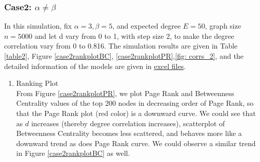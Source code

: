 \documentclass{article}
\begin{document}
\subsubsection{Case2: $\alpha \neq \beta$}
\quad
\par In this simulation, fix $\alpha=3, \beta=5$, and expected degree $E = 50$, graph size $ n=5000$ and let d vary from 0 to 1, with step size 2,  to make the degree correlation vary from 0 to 0.816. The simulation results are given in Table \ref{table2}, Figure \ref{case2rankplotBC}, \ref{case2rankplotPR},\ref{fig: corrs_2}, and the detailed information of the models are given in \href{https://github.com/leahwu/DCM_simulaiton_and_analysis/tree/master/output_data/part2_case2}{excel files}.

\begin{enumerate}
\item Ranking Plot \\
From Figure \ref{case2rankplotPR}, we plot Page Rank and Betweenness Centrality values of the top 200 nodes in decreasing order of Page Rank, so that the Page Rank plot (red color) is a downward curve. We could see that as $d$ increases (thereby degree correlation increases), scatterplot of Betweenness Centrality  becomes less scattered, and behaves more like a downward trend as does Page Rank curve. We could observe a similar trend in Figure \ref{case2rankplotBC} as well.\\


\end{enumerate}
\end{document}
